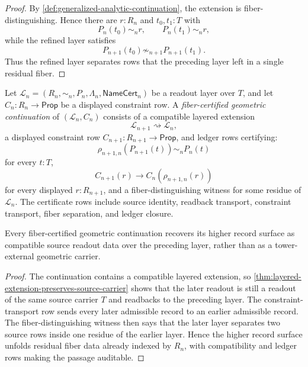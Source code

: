 \begin{proof}
By \autoref{def:generalized-analytic-continuation}, the extension is
fiber-distinguishing. Hence there are $r:R_n$ and $t_0,t_1:T$ with
$$
P_n(t_0)\sim_n r,
\qquad
P_n(t_1)\sim_n r,
$$
while the refined layer satisfies
$$
P_{n+1}(t_0)\not\sim_{n+1}P_{n+1}(t_1).
$$
Thus the refined layer separates rows that the preceding layer left in a
single residual fiber.
\end{proof}

\begin{definition}
\label{def:fiber-certified-geometric-continuation}
Let $\mathcal L_n=(R_n,\sim_n,P_n,\Lambda_n,\mathsf{NameCert}_n)$ be a
readout layer over $T$, and let $C_n:R_n\to\mathsf{Prop}$ be a displayed
constraint row. A \emph{fiber-certified geometric continuation} of
$(\mathcal L_n,C_n)$ consists of a compatible layered extension
$$
\mathcal L_{n+1}\rightsquigarrow\mathcal L_n,
$$
a displayed constraint row $C_{n+1}:R_{n+1}\to\mathsf{Prop}$, and ledger
rows certifying:
$$
\rho_{n+1,n}(P_{n+1}(t))\sim_n P_n(t)
$$
for every $t:T$,
$$
C_{n+1}(r)\to C_n(\rho_{n+1,n}(r))
$$
for every displayed $r:R_{n+1}$, and a fiber-distinguishing witness for
some residue of $\mathcal L_n$. The certificate rows include source
identity, readback transport, constraint transport, fiber separation, and
ledger closure.
\end{definition}

\begin{theorem}
\label{thm:geometric-continuation-unfolds-residual-fibers}
Every fiber-certified geometric continuation recovers its higher record
surface as compatible source readout data over the preceding layer, rather
than as a tower-external geometric carrier.
\end{theorem}

\begin{proof}
The continuation contains a compatible layered extension, so
\autoref{thm:layered-extension-preserves-source-carrier} shows that the
later readout is still a readout of the same source carrier $T$ and
readbacks to the preceding layer. The constraint-transport row sends every
later admissible record to an earlier admissible record. The
fiber-distinguishing witness then says that the later layer separates two
source rows inside one residue of the earlier layer. Hence the higher
record surface unfolds residual fiber data already indexed by
$R_n$, with compatibility and ledger rows making the passage auditable.
\end{proof}

